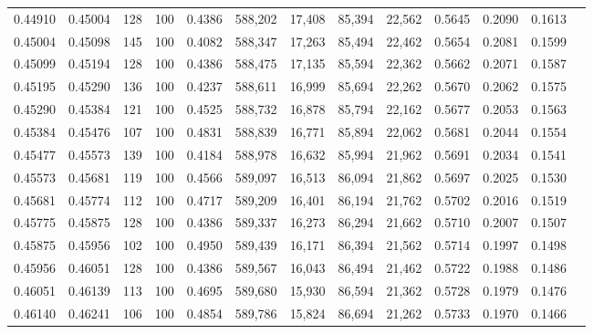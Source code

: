 \begin{tabular}{rrrrrrrrrrrrr}
0.44910 & 0.45004 &   128 & 100 &                                     0.4386 & 588,202 &  17,408 &  85,394 &  22,562 & 0.5645 & 0.2090 & 0.1613 \\
0.45004 & 0.45098 &   145 & 100 &                                     0.4082 & 588,347 &  17,263 &  85,494 &  22,462 & 0.5654 & 0.2081 & 0.1599 \\
0.45099 & 0.45194 &   128 & 100 &                                     0.4386 & 588,475 &  17,135 &  85,594 &  22,362 & 0.5662 & 0.2071 & 0.1587 \\
0.45195 & 0.45290 &   136 & 100 &                                     0.4237 & 588,611 &  16,999 &  85,694 &  22,262 & 0.5670 & 0.2062 & 0.1575 \\
0.45290 & 0.45384 &   121 & 100 &                                     0.4525 & 588,732 &  16,878 &  85,794 &  22,162 & 0.5677 & 0.2053 & 0.1563 \\
0.45384 & 0.45476 &   107 & 100 &                                     0.4831 & 588,839 &  16,771 &  85,894 &  22,062 & 0.5681 & 0.2044 & 0.1554 \\
0.45477 & 0.45573 &   139 & 100 &                                     0.4184 & 588,978 &  16,632 &  85,994 &  21,962 & 0.5691 & 0.2034 & 0.1541 \\
0.45573 & 0.45681 &   119 & 100 &                                     0.4566 & 589,097 &  16,513 &  86,094 &  21,862 & 0.5697 & 0.2025 & 0.1530 \\
0.45681 & 0.45774 &   112 & 100 &                                     0.4717 & 589,209 &  16,401 &  86,194 &  21,762 & 0.5702 & 0.2016 & 0.1519 \\
0.45775 & 0.45875 &   128 & 100 &                                     0.4386 & 589,337 &  16,273 &  86,294 &  21,662 & 0.5710 & 0.2007 & 0.1507 \\
0.45875 & 0.45956 &   102 & 100 &                                     0.4950 & 589,439 &  16,171 &  86,394 &  21,562 & 0.5714 & 0.1997 & 0.1498 \\
0.45956 & 0.46051 &   128 & 100 &                                     0.4386 & 589,567 &  16,043 &  86,494 &  21,462 & 0.5722 & 0.1988 & 0.1486 \\
0.46051 & 0.46139 &   113 & 100 &                                     0.4695 & 589,680 &  15,930 &  86,594 &  21,362 & 0.5728 & 0.1979 & 0.1476 \\
0.46140 & 0.46241 &   106 & 100 &                                     0.4854 & 589,786 &  15,824 &  86,694 &  21,262 & 0.5733 & 0.1970 & 0.1466 \\

\end{tabular}
